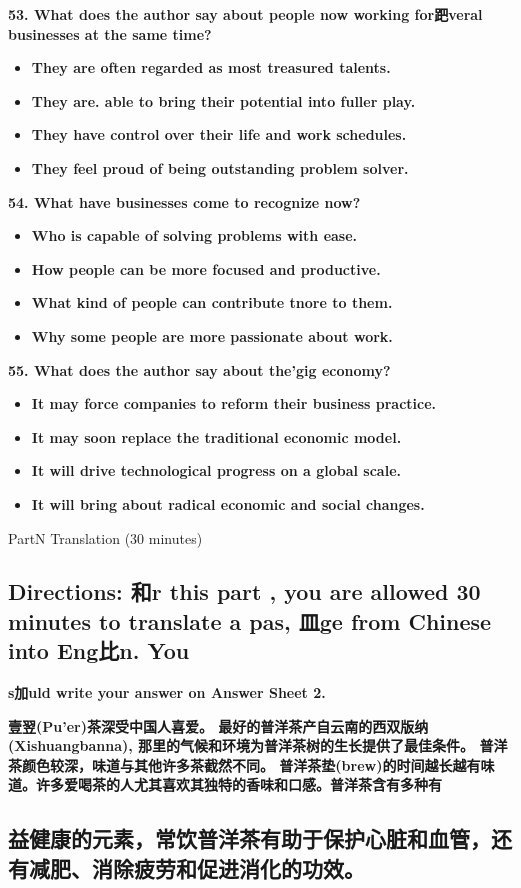 \documentclass[UTF8,11pt]{ctexart}
\begin{document}
\textbf{53. What does the author say about people now working for跁veral businesses at the same time?}


\begin{itemize}[leftmargin=2em,itemsep=.2em,topsep=.4em]\item[A.] \textbf{They are often regarded as most treasured talents.}
\item[B.] \textbf{They are. able to bring their potential into fuller play.}
\item[C.] \textbf{They have control over their life and work schedules.}
\item[D.] \textbf{They feel proud of being outstanding problem solver.}
\end{itemize}

\textbf{54. What have businesses come to recognize now?}


\begin{itemize}[leftmargin=2em,itemsep=.2em,topsep=.4em]\item[A.] \textbf{Who is capable of solving problems with ease.}
\item[B.] \textbf{How people can be more focused and productive.}
\item[C.] \textbf{What kind of people can contribute tnore to them.}
\item[D.] \textbf{Why some people are more passionate about work.}
\end{itemize}

\textbf{55. What does the author say about the'gig economy?}


\begin{itemize}[leftmargin=2em,itemsep=.2em,topsep=.4em]\item[A.] \textbf{It may force companies to reform their business practice.}
\item[B.] \textbf{It may soon replace the traditional economic model.}
\item[C.] \textbf{It will drive technological progress on a global scale.}
\item[D.] \textbf{It will bring about radical economic and social changes.}
\end{itemize}

PartN Translation (30 minutes)


\subsection*{\textbf{Directions: 和r this part , you are allowed 30 minutes to translate a pas, 皿ge from Chinese into Eng比}n. \textbf{You}}


\textbf{s加uld write your answer on Answer Sheet 2.}


\textbf{壹翌(Pu'er)茶深受中国人喜爱。 最好的普洋茶产自云南的西双版纳(Xishuangbanna), 那里的气候和环境为普洋茶树的生长提供了最佳条件。 普洋茶颜色较深，味道与其他许多茶截然不同。 普洋茶垫(brew)的时间越长越有味道。许多爱喝茶的人尤其喜欢其独特的香味和口感。普洋茶含有多种有}


\subsection*{\textbf{益健康的元素，常饮普洋茶有助于保护心脏和血管，还有减肥、消除疲劳和促进消化的功效。}}
\end{document}
